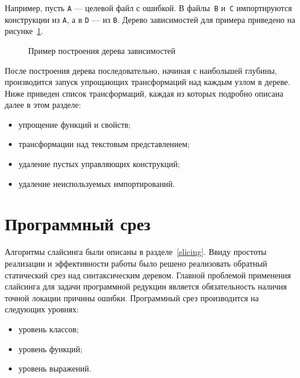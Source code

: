 Например, пусть \texttt{A} --- целевой файл с ошибкой. В файлы~\texttt{B} и~\texttt{C} импортируются конструкции из \texttt{А}, а в \texttt{D} --- из \texttt{B}. Дерево зависимостей для примера приведено на рисунке~\ref{ex:tree}. 
%
\begin{figure}
\caption{\label{ex:tree}Пример построения дерева зависимостей}
\end{figure}
%
После построения дерева последовательно, начиная с наибольшей глубины, производится запуск упрощающих трансформаций над каждым узлом в дереве. Ниже приведен список трансформаций, каждая из которых подробно описана далее в этом разделе:
%
\begin{itemize}
	\item упрощение функций и свойств;
	\item трансформации над текстовым представлением;
	\item удаление пустых управляющих конструкций;
	\item удаление неиспользуемых импортирований.
\end{itemize}

\section{Программный срез}\label{slicingalg}
Алгоритмы слайсинга были описаны в разделе~\ref{slicing}. Ввиду простоты реализации и эффективности работы было решено реализовать обратный статический срез над синтаксическим деревом. Главной проблемой применения слайсинга для задачи программной редукции является обязательность наличия точной локации причины ошибки.
Программный срез производится на следующих уровнях:
\begin{itemize}
	\item уровень классов;
	\item уровень функций;
	\item уровень выражений.
\end{itemize}

